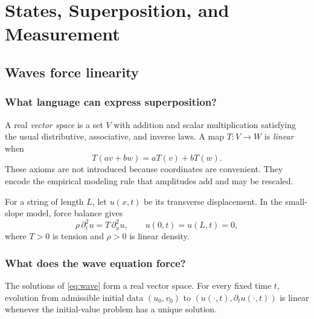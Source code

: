 \part{States, Superposition, and Measurement}

\chapter{Waves force linearity}
\label{ch:waves}



\section{What language can express superposition?}

A real \emph{vector space} is a set $V$ with addition and scalar
multiplication satisfying the usual distributive, associative, and inverse
laws.  A map $T:V\to W$ is \emph{linear} when
\[
T(av+bw)=aT(v)+bT(w).
\]
These axioms are not introduced because coordinates are convenient.  They
encode the empirical modeling rule that amplitudes add and may be rescaled.

For a string of length $L$, let $u(x,t)$ be its transverse displacement.  In
the small-slope model, force balance gives
\begin{equation}
\rho\,\partial_t^2u=T\,\partial_x^2u,
\qquad u(0,t)=u(L,t)=0,
\label{eq:wave}
\end{equation}
where $T>0$ is tension and $\rho>0$ is linear density.

\section{What does the wave equation force?}

\begin{theorem}[Superposition]
The solutions of \eqref{eq:wave} form a real vector space.  For every fixed
time $t$, evolution from admissible initial data $(u_0,v_0)$ to
$(u(\cdot,t),\partial_tu(\cdot,t))$ is linear whenever the initial-value
problem has a unique solution.
\end{theorem}

